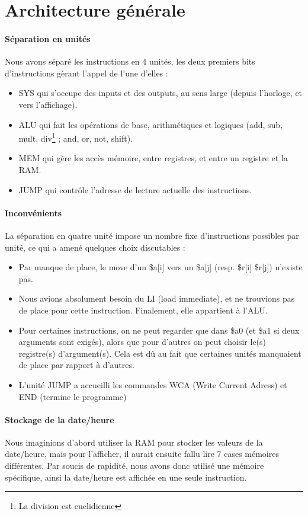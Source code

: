 \documentclass{article}
\begin{document}
\section{Architecture générale}

\paragraph{Séparation en unités}
Nous avons séparé les instructions en 4 unités, les deux premiers bits
d'instructions gèrant l'appel de l'une d'elles :
\begin{itemize}
  \item SYS qui s'occupe des inputs et des outputs, au sens large (depuis
    l'horloge, et vers l'affichage).
  \item ALU qui fait les opérations de base, arithmétiques et logiques (add,
    sub, mult, div\footnote{La division est euclidienne} ; and, or, not, shift).
  \item MEM qui gère les accès mémoire, entre registres, et entre un registre
    et la RAM.
  \item JUMP qui contrôle l'adresse de lecture actuelle des instructions.
\end{itemize}

\paragraph{Inconvénients}
La séparation en quatre unité impose un nombre fixe d'instructions possibles
par unité, ce qui a amené quelques choix discutables :
\begin{itemize}
  \item Par manque de place, le move d'un \$a[i] vers un \$a[j]
    (resp. \$r[i] \$r[j]) n'existe pas.
  \item Nous avions absolument besoin du LI (load immediate), et ne trouvions
    pas de place pour cette instruction. Finalement, elle appartient à l'ALU.
  \item Pour certaines instructions, on ne peut regarder que dans \$a0 (et \$a1
    si deux arguments sont exigés), alors que pour d'autres on peut choisir
    le(s) registre(s) d'argument(s). Cela est dû au fait que certaines unités
    manquaient de place par rapport à d'autres.
  \item L'unité JUMP a accueilli les commandes WCA (Write Current Adress) et
    END (termine le programme)
\end{itemize}

\paragraph{Stockage de la date/heure}
Nous imaginions d'abord utiliser la RAM pour stocker les valeurs de la
date/heure, mais pour l'afficher, il aurait ensuite fallu lire 7 cases mémoires
différentes. Par soucis de rapidité, nous avons donc utilisé une mémoire
spécifique, ainsi la date/heure est affichée en une seule instruction.
\end{document}
